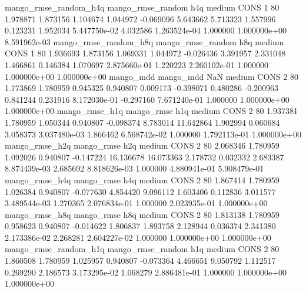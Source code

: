 mango_rmse_random_h4q mango_rmse_random                  h4q     medium     CONS                 1 80  1.978871       1.873156 1.104674       1.044972   -0.069096      5.643662      5.713323     1.557996       0.123231  1.952034 5.447750e-02     4.032586   1.263524e-04            1.000000    1.000000e+00        8.591962e-03
mango_rmse_random_h8q mango_rmse_random                  h8q     medium     CONS                 1 80  1.936693       1.873156 1.069331       1.044972   -0.026436      3.391957      2.331048     1.466861       0.146384  1.070697 2.875660e-01     1.220223   2.260102e-01            1.000000    1.000000e+00        1.000000e+00
            mango_mdd         mango_mdd                  NaN     medium     CONS                 2 80  1.773869       1.780959 0.945325       0.940807    0.009173     -0.398071      0.480286    -0.200963       0.841244  0.231916 8.172030e-01    -0.297160   7.671240e-01            1.000000    1.000000e+00        1.000000e+00
       mango_rmse_h1q        mango_rmse                  h1q     medium     CONS                 2 80  1.937381       1.780959 1.050344       0.940807   -0.098374      8.783014     11.642864     1.902994       0.060684  3.058373 3.037480e-03     1.866462   6.568742e-02            1.000000    1.792113e-01        1.000000e+00
       mango_rmse_h2q        mango_rmse                  h2q     medium     CONS                 2 80  2.068346       1.780959 1.092026       0.940807   -0.147224     16.136678     16.073363     2.178732       0.032332  2.683387 8.874439e-03     2.685692   8.818626e-03            1.000000    4.880941e-01        5.908479e-01
       mango_rmse_h4q        mango_rmse                  h4q     medium     CONS                 2 80  1.867414       1.780959 1.026384       0.940807   -0.077630      4.854420      9.096112     1.603406       0.112836  3.011577 3.489544e-03     1.270365   2.076834e-01            1.000000    2.023935e-01        1.000000e+00
       mango_rmse_h8q        mango_rmse                  h8q     medium     CONS                 2 80  1.813138       1.780959 0.958623       0.940807   -0.014622      1.806837      1.893758     2.128944       0.036374  2.341380 2.173386e-02     2.268281   2.604227e-02            1.000000    1.000000e+00        1.000000e+00
mango_rmse_random_h1q mango_rmse_random                  h1q     medium     CONS                 2 80  1.860508       1.780959 1.025957       0.940807   -0.073364      4.466651      9.050792     1.112517       0.269290  2.186573 3.173295e-02     1.068279   2.886481e-01            1.000000    1.000000e+00        1.000000e+00

